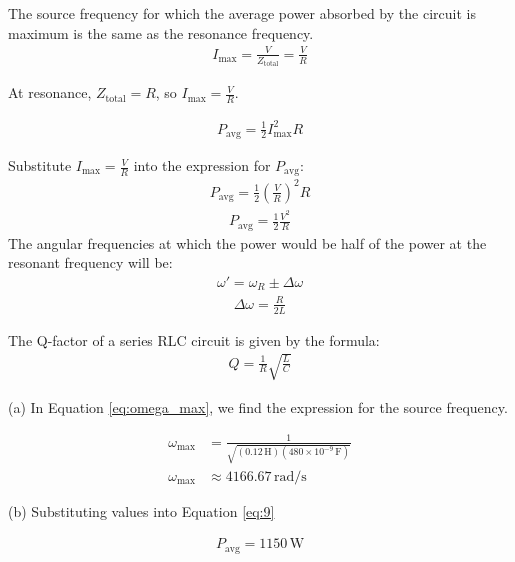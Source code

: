 \documentclass[journal,12pt,twocolumn]{IEEEtran}
\theoremstyle{remark}
\begin{document}
The source frequency for which the average power absorbed by the circuit is maximum is the same as the resonance frequency. 
\begin{align}
    I_{\text{max}} = \frac{V}{Z_{\text{total}}} = \frac{V}{R}
\end{align}

At resonance, \(Z_{\text{total}} = R\), so \(I_{\text{max}} = \frac{V}{R}\).

\begin{align}
    P_{\text{avg}} = \frac{1}{2} I_{\text{max}}^2 R
\end{align}

Substitute \(I_{\text{max}} = \frac{V}{R}\) into the expression for \(P_{\text{avg}}\):
\begin{align}
    P_{\text{avg}} = \frac{1}{2} \left(\frac{V}{R}\right)^2 R
\end{align}
\begin{align}
    P_{\text{avg}} = \frac{1}{2} \frac{V^2}{R}
    \label{eq:9}
\end{align}
The angular frequencies at which the power would be half of the power at the resonant frequency will be:
\begin{align}
    \omega' = \omega_R \pm \Delta\omega \label{eq:10}
\end{align}
\begin{align}
 \Delta\omega = \frac{R}{2L} 
 \label{eq:11}
\end{align}

The Q-factor of a series RLC circuit is given by the formula:
\begin{align}
    Q = \frac{1}{R} \sqrt{\frac{L}{C}} \label{eq:Qfact}
\end{align}

(a) In Equation \eqref{eq:omega_max}, we find the expression for the source frequency.

\begin{align}
    \omega_{\text{max}} &= \frac{1}{\sqrt{(0.12 \, \text{H})(480 \times 10^{-9} \, \text{F})}} \\
    \omega_{\text{max}} &\approx 4166.67 \, \text{rad/s}
\end{align}

(b)
Substituting values into Equation \eqref{eq:9}

\begin{align}
    P_{\text{avg}} = 1150 \, \text{W}
\end{align}
\end{document}

